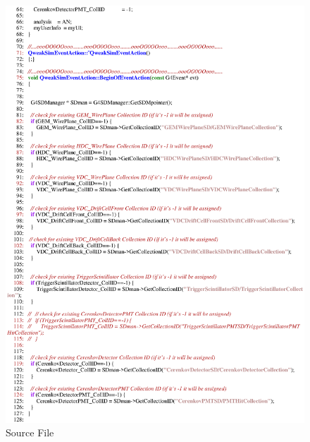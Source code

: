\clearpage

\begin{figure}[h]
  \hspace{0cm}
  \includegraphics[scale=0.8]{./figures13/QweakSimEventAction.cc-p2.eps}
  \caption{Source File}
           \label{fig:XIII-SC-17}
\end{figure}

\clearpage

